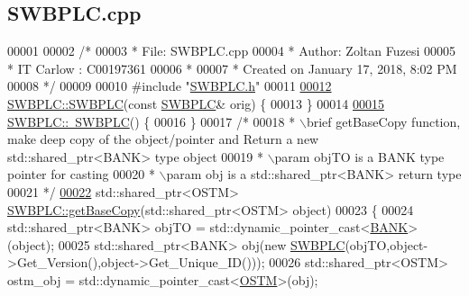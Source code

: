 \hypertarget{_s_w_b_p_l_c_8cpp_source}{}\subsection{S\+W\+B\+P\+L\+C.\+cpp}

\begin{DoxyCode}
00001 
00002 \textcolor{comment}{/* }
00003 \textcolor{comment}{ * File:   SWBPLC.cpp}
00004 \textcolor{comment}{ * Author: Zoltan Fuzesi}
00005 \textcolor{comment}{ * IT Carlow : C00197361}
00006 \textcolor{comment}{ *}
00007 \textcolor{comment}{ * Created on January 17, 2018, 8:02 PM}
00008 \textcolor{comment}{ */}
00009 
00010 \textcolor{preprocessor}{#include "\hyperlink{_s_w_b_p_l_c_8h}{SWBPLC.h}"}
00011 
\hypertarget{_s_w_b_p_l_c_8cpp_source.tex_l00012}{}\hyperlink{class_s_w_b_p_l_c_a767c6ae2b15f523b5ec6e35e137dcc96_a767c6ae2b15f523b5ec6e35e137dcc96}{00012} \hyperlink{class_s_w_b_p_l_c_a320f4e2b023038668d941ce5d0c46aeb_a320f4e2b023038668d941ce5d0c46aeb}{SWBPLC::SWBPLC}(\textcolor{keyword}{const} \hyperlink{class_s_w_b_p_l_c}{SWBPLC}& orig) \{
00013 \}
00014 
\hypertarget{_s_w_b_p_l_c_8cpp_source.tex_l00015}{}\hyperlink{class_s_w_b_p_l_c_a5d6f00a76145f32424ff6db9ac23c6fe_a5d6f00a76145f32424ff6db9ac23c6fe}{00015} \hyperlink{class_s_w_b_p_l_c_a5d6f00a76145f32424ff6db9ac23c6fe_a5d6f00a76145f32424ff6db9ac23c6fe}{SWBPLC::~SWBPLC}() \{
00016 \}
00017 \textcolor{comment}{/*}
00018 \textcolor{comment}{ * \(\backslash\)brief getBaseCopy function, make deep copy of the object/pointer and Return a new std::shared\_ptr<BANK>
       type object}
00019 \textcolor{comment}{ * \(\backslash\)param objTO is a BANK type pointer for casting}
00020 \textcolor{comment}{ * \(\backslash\)param obj is a std::shared\_ptr<BANK> return type}
00021 \textcolor{comment}{ */}
\hypertarget{_s_w_b_p_l_c_8cpp_source.tex_l00022}{}\hyperlink{class_s_w_b_p_l_c_a77f0e0d6c08a95066d277bf6b2073a5c_a77f0e0d6c08a95066d277bf6b2073a5c}{00022} std::shared\_ptr<OSTM> \hyperlink{class_s_w_b_p_l_c_a77f0e0d6c08a95066d277bf6b2073a5c_a77f0e0d6c08a95066d277bf6b2073a5c}{SWBPLC::getBaseCopy}(std::shared\_ptr<OSTM> \textcolor{keywordtype}{object})
00023 \{
00024     std::shared\_ptr<BANK> objTO = std::dynamic\_pointer\_cast<\hyperlink{class_b_a_n_k}{BANK}>(object);
00025     std::shared\_ptr<BANK> obj(\textcolor{keyword}{new} \hyperlink{class_s_w_b_p_l_c_a320f4e2b023038668d941ce5d0c46aeb_a320f4e2b023038668d941ce5d0c46aeb}{SWBPLC}(objTO,object->Get\_Version(),\textcolor{keywordtype}{object}->Get\_Unique\_ID())); 
00026     std::shared\_ptr<OSTM> ostm\_obj = std::dynamic\_pointer\_cast<\hyperlink{class_o_s_t_m}{OSTM}>(obj);                             
           

\end{DoxyCode}
